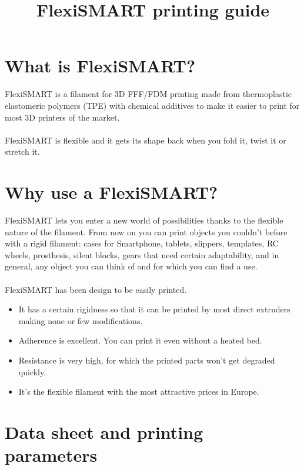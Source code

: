 \documentclass[11pt,a4paper]{article}
\title{﻿FlexiSMART printing guide}
\date{}
\begin{document}

\section{What is FlexiSMART?}FlexiSMART is a filament for 3D FFF/FDM printing made from thermoplastic elastomeric polymers (TPE) with chemical additives to make it easier to print for most 3D printers of the market.
\\\\
FlexiSMART is flexible and it gets its shape back when you fold it, twist it or stretch it.

\section{Why use a FlexiSMART?}
FlexiSMART lets you enter a new world of possibilities thanks to the flexible nature of the filament. From now on you can print objects you couldn’t before with a rigid filament: cases for Smartphone, tablets, slippers, templates, RC wheels, prosthesis, silent blocks, gears that need certain adaptability, and in general, any object you can think of and for which you can find a use.
\\\\
FlexiSMART has been design to be easily printed.
\begin{itemize}
\item It has a certain rigidness so that it can be printed by most direct extruders making none or few modifications.
\item Adherence is excellent. You can print it even without a heated bed.
\item Resistance is very high, for which the printed parts won’t get degraded quickly.
\item It’s the flexible filament with the most attractive prices in Europe.
\end{itemize}

\section{Data sheet and printing parameters}
\end{document}
